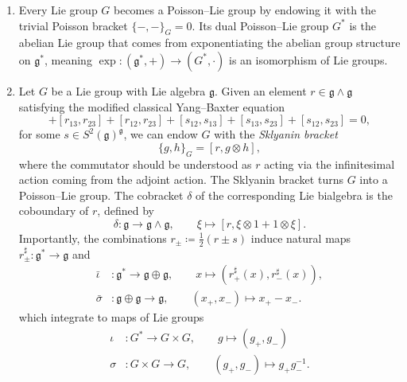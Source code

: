 \begin{example}\label{ex:PoissonLieGroup}
	\begin{enumerate}[label=(\roman*)]
		\item \label{ex:trivPoissonLieGroup} Every Lie group $G$ becomes a Poisson--Lie group by endowing it with the trivial Poisson bracket $\{ -,- \}_G = 0$. Its dual Poisson--Lie group $G^*$ is the abelian Lie group that comes from exponentiating the abelian group structure on $\mathfrak{g}^*$, meaning $\exp\colon (\mathfrak{g}^*,+) \to (G^*,\cdot)$ is an isomorphism of Lie groups.
		\item Let $G$ be a Lie group with Lie algebra $\mathfrak{g}$. Given an element $r \in \mathfrak{g} \wedge \mathfrak{g}$ satisfying the modified classical Yang--Baxter equation
		\begin{equation}
			[r_{12},r_{13}] + [r_{13},r_{23}] + [r_{12},r_{23}] + [s_{12},s_{13}] + [s_{13},s_{23}] + [s_{12},s_{23}] = 0,
		\end{equation}
		for some $s \in S^2(\mathfrak{g})^\mathfrak{g}$, we can endow $G$ with the \emph{Sklyanin bracket}
		\begin{equation}
			\{ g,h \}_G = [r,g \otimes h],
		\end{equation}
		where the commutator should be understood as $r$ acting via the infinitesimal action coming from the adjoint action. The Sklyanin bracket turns $G$ into a Poisson--Lie group. The cobracket $\delta$ of the corresponding Lie bialgebra is the coboundary of $r$, defined by
		\begin{equation}
			\delta\colon \mathfrak{g} \to \mathfrak{g} \wedge \mathfrak{g}, \qquad \xi \mapsto [r,\xi \otimes 1 + 1 \otimes \xi].
		\end{equation}
		Importantly, the combinations $r_\pm \coloneq \frac{1}{2}(r \pm s)$ induce natural maps $r_\pm^\sharp\colon \mathfrak{g}^* \to \mathfrak{g}$ and
		\begin{align}
			\bar \iota &\colon \mathfrak{g}^* \to \mathfrak{g} \oplus \mathfrak{g}, \qquad x \mapsto (r_+^\sharp(x),r_-^\sharp(x)), \\
			\bar \sigma &\colon \mathfrak{g} \oplus \mathfrak{g} \to \mathfrak{g}, \qquad (x_+,x_-) \mapsto x_+-x_-.
		\end{align}
		which integrate to maps of Lie groups
		\begin{align}
			\iota &\colon G^* \to G \times G, \qquad g \mapsto (g_+,g_-) \\
			\sigma &\colon G \times G \to G, \qquad (g_+,g_-) \mapsto g_+ g_-^{-1}.
		\end{align}

\end{enumerate}
\end{example}
